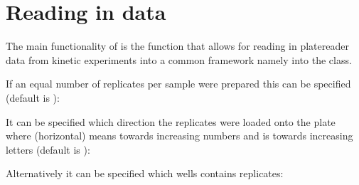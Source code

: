 \documentclass[letterpaper,10pt,english]{sphinxmanual}
\begin{document}
\section{Reading in data}
\label{\detokenize{cookbook:reading-in-data}}
The main functionality of  is the  function
that allows for reading in platereader data from kinetic experiments
into a common framework namely into the  class.

If an equal number of replicates per sample were prepared
this can be specified (default is ):

%
\begin{sphinxVerbatim}[commandchars=\\\{\}]
   
\end{sphinxVerbatim}

It can be specified which direction the replicates were loaded
onto the plate where  (horizontal) means towards
increasing numbers and  is towards increasing letters
(default is ):

%
\begin{sphinxVerbatim}[commandchars=\\\{\}]
   
\end{sphinxVerbatim}


Alternatively it can be specified which wells contains replicates:

%
\begin{sphinxVerbatim}[commandchars=\\\{\}]
   \PYG{p}{[}\PYG{p}{[} \PYG{p}{]} \PYG{p}{[}  \PYG{p}{]}\PYG{p}{]}
\end{sphinxVerbatim}
\end{document}
